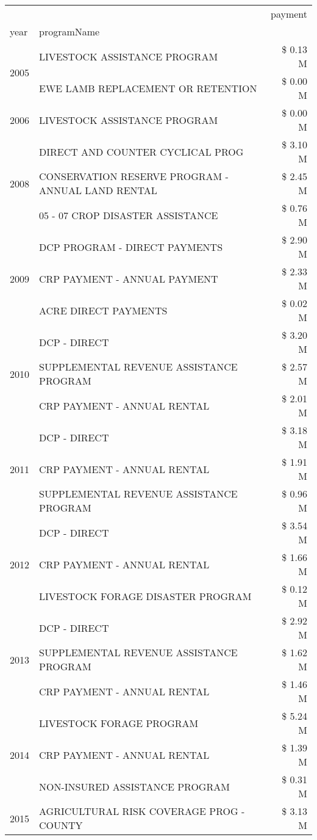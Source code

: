 \begin{tabular}{llr}
\toprule
 &  & payment \\
year & programName &  \\
\midrule
\multirow[t]{2}{*}{2005} & LIVESTOCK ASSISTANCE PROGRAM & \$ 0.13 M \\
 & EWE LAMB REPLACEMENT OR RETENTION & \$ 0.00 M \\
\cline{1-3}
2006 & LIVESTOCK ASSISTANCE PROGRAM & \$ 0.00 M \\
\cline{1-3}
\multirow[t]{3}{*}{2008} & DIRECT AND COUNTER CYCLICAL PROG & \$ 3.10 M \\
 & CONSERVATION RESERVE PROGRAM - ANNUAL LAND RENTAL & \$ 2.45 M \\
 & 05 - 07 CROP DISASTER ASSISTANCE & \$ 0.76 M \\
\cline{1-3}
\multirow[t]{3}{*}{2009} & DCP PROGRAM - DIRECT PAYMENTS & \$ 2.90 M \\
 & CRP PAYMENT - ANNUAL PAYMENT & \$ 2.33 M \\
 & ACRE DIRECT PAYMENTS & \$ 0.02 M \\
\cline{1-3}
\multirow[t]{3}{*}{2010} & DCP - DIRECT & \$ 3.20 M \\
 & SUPPLEMENTAL REVENUE ASSISTANCE PROGRAM & \$ 2.57 M \\
 & CRP PAYMENT - ANNUAL RENTAL & \$ 2.01 M \\
\cline{1-3}
\multirow[t]{3}{*}{2011} & DCP - DIRECT & \$ 3.18 M \\
 & CRP PAYMENT - ANNUAL RENTAL & \$ 1.91 M \\
 & SUPPLEMENTAL REVENUE ASSISTANCE PROGRAM & \$ 0.96 M \\
\cline{1-3}
\multirow[t]{3}{*}{2012} & DCP - DIRECT & \$ 3.54 M \\
 & CRP PAYMENT - ANNUAL RENTAL & \$ 1.66 M \\
 & LIVESTOCK FORAGE DISASTER PROGRAM & \$ 0.12 M \\
\cline{1-3}
\multirow[t]{3}{*}{2013} & DCP - DIRECT & \$ 2.92 M \\
 & SUPPLEMENTAL REVENUE ASSISTANCE PROGRAM & \$ 1.62 M \\
 & CRP PAYMENT - ANNUAL RENTAL & \$ 1.46 M \\
\cline{1-3}
\multirow[t]{3}{*}{2014} & LIVESTOCK FORAGE PROGRAM & \$ 5.24 M \\
 & CRP PAYMENT - ANNUAL RENTAL & \$ 1.39 M \\
 & NON-INSURED ASSISTANCE PROGRAM & \$ 0.31 M \\
\cline{1-3}
\multirow[t]{3}{*}{2015} & AGRICULTURAL RISK COVERAGE PROG - COUNTY & \$ 3.13 M \\

\end{tabular}
